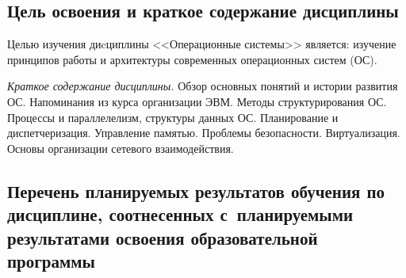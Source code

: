 \documentclass[a4paper,12pt]{article}
\begin{document}
\subsection{Цель освоения и краткое содержание дисциплины}
  
  Целью изучения диcциплины <<Операционные системы>> является: изучение принципов работы и архитектуры современных операционных систем (ОС).
  
  
  \textit{Краткое содержание дисциплины.}  Обзор основных понятий и истории развития ОС. Напоминания из курса организации ЭВМ.
   Методы структурирования ОС. Процессы и параллелелизм, структуры данных ОС. Планирование и диспетчеризация.
   Управление памятью. Проблемы безопасности. Виртуализация. Основы организации сетевого взаимодействия.
  
  
  



\subsection{Перечень планируемых результатов обучения по дисциплине, соотнесенных с~планируемыми результатами освоения образовательной программы}
\end{document}
